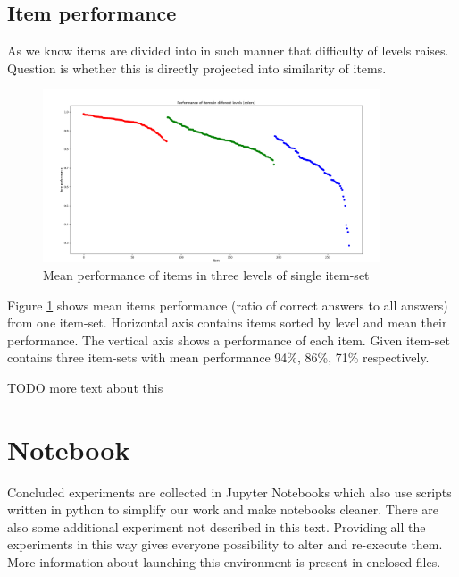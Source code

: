 \documentclass[
  digital, %
  table,   %
  nolof,     %
  nolot,     %
  nocover,
  color
]{fithesis3}
\begin{document}

\subsection{Item performance}\label{item-performance}

As we know items are divided into in such manner that difficulty of levels raises. Question is whether this is directly projected into similarity of items.

\begin{figure}
  \includegraphics[width=10cm]{img/items_performance_levels}
  \caption{Mean performance of items in three levels of single item-set}
  \label{fig:item_performance_levels}
\end{figure}

Figure \ref{fig:item_performance_levels} shows mean items performance (ratio of correct answers to all answers) from one item-set. Horizontal axis contains items sorted by level and mean their performance. The vertical axis shows a performance of each item. Given item-set contains three item-sets with mean performance 94\%, 86\%, 71\% respectively.

TODO more text about this


%


\section{Notebook}\label{notebook}

Concluded experiments are collected in Jupyter Notebooks which also use scripts written in python to simplify our work and make notebooks cleaner. There are also some additional experiment not described in this text. Providing all the experiments in this way gives everyone possibility to alter and re-execute them. More information about launching this environment is present in enclosed files.
\end{document}
